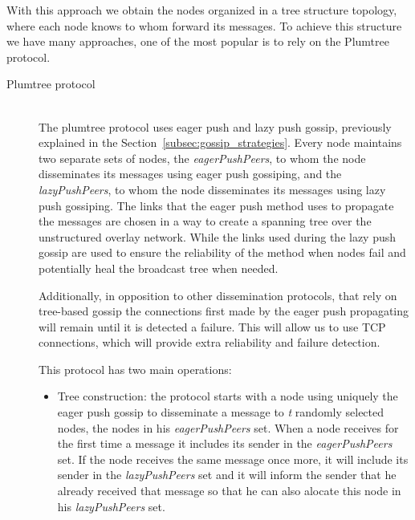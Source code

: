 With this approach we obtain the nodes organized in a tree structure topology, where each node
knows to whom forward its messages. To achieve this structure we have many approaches, one of
the most popular is to rely on the \gls{Plumtree} protocol.
\begin{description}
      \item[Plumtree protocol] \hfill \\
            The plumtree protocol \cite{Leitao2007Tree} uses eager push and lazy push gossip,
            previously explained in the Section~\ref{subsec:gossip_strategies}. Every node
            maintains two separate sets of nodes, the \textit{eagerPushPeers}, to whom the
            node disseminates its messages using eager push gossiping, and the \textit{lazyPushPeers},
            to whom the node disseminates its messages using lazy push gossiping.
            The links that the eager push method uses to propagate the messages are
            chosen in a way to create a spanning tree over the unstructured overlay network.
            While the links used during the lazy push gossip are used to ensure the
            reliability of the method when nodes fail and potentially heal the broadcast tree
            when needed.

            Additionally, in opposition to other dissemination protocols, that rely on
            tree-based gossip the connections first made by the eager push propagating will
            remain until it is detected a failure. This will allow us to use \Gls{TCP}
            connections, which will provide extra reliability and failure detection.

            This protocol has two main operations:
            \begin{itemize}
                  \item Tree construction: the protocol starts with a node using uniquely the
                        eager push gossip to disseminate a message to \textit{t} randomly selected
                        nodes, the nodes in his \textit{eagerPushPeers} set. When a node
                        receives for the first time a message it includes its sender in the
                        \textit{eagerPushPeers} set. If the node receives the same message
                        once more, it will include its sender in the \textit{lazyPushPeers}
                        set and it will inform the sender that he already received that
                        message so that he can also alocate this node in his \textit{lazyPushPeers}
                        set.


\end{itemize}
\end{description}
